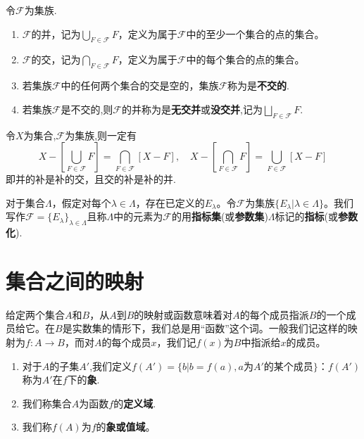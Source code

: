 \documentclass[lang=cn,newtx,10pt,scheme=chinese]{../Template/elegantbook}
\begin{document}
\begin{definition}[集族的并和交]\label{definition:集族的并和交}
  令\(\mathcal{F}\)为集族.
  \begin{enumerate}
    \item \(\mathcal{F}\)的并，记为\(\bigcup_{F\in\mathcal{F}}F\)，定义为属于\(\mathcal{F}\)中的至少一个集合的点的集合。

    \item \(\mathcal{F}\)的交，记为\(\bigcap_{F\in\mathcal{F}}F\)，定义为属于\(\mathcal{F}\)中的每个集合的点的集合。
    
    \item 若集族\(\mathcal{F}\)中的任何两个集合的交是空的，集族\(\mathcal{F}\)称为是\textbf{不交的}.

    \item 若集族\(\mathcal{F}\)是不交的,则\(\mathcal{F}\)的并称为是\textbf{无交并}或\textbf{没交并},记为$\bigsqcup_{F\in \mathcal{F}}{F}$.
  \end{enumerate}
\end{definition}

\begin{theorem}[De Morgan等式]\label{theorem:De Morgan等式}
  令$X$为集合,\(\mathcal{F}\)为集族,则一定有
\[
X-\left[\bigcup_{F\in\mathcal{F}}F\right]=\bigcap_{F\in\mathcal{F}}[X- F],\quad X-\left[\bigcap_{F\in\mathcal{F}}F\right]=\bigcup_{F\in\mathcal{F}}[X- F]
\]
即并的补是补的交，且交的补是补的并.
\end{theorem}

\begin{definition}[指标集]\label{definition:指标集}
  对于集合\(\Lambda\)，假定对每个\(\lambda\in\Lambda\)，存在已定义的\(E_{\lambda}\)。令\(\mathcal{F}\)为集族\(\{E_{\lambda}|\lambda\in\Lambda\}\)。我们写作\(\mathcal{F}=\{E_{\lambda}\}_{\lambda\in\Lambda}\)且称$\Lambda$中的元素为\(\mathcal{F}\)的用\textbf{指标集}(或\textbf{参数集})\(\Lambda\)标记的\textbf{指标}(或\textbf{参数化}).
\end{definition}


\section{集合之间的映射}

\begin{definition}[映射的基本概念]\label{definition:映射的基本概念}
  给定两个集合\(A\)和\(B\)，从\(A\)到\(B\)的映射或函数意味着对\(A\)的每个成员指派\(B\)的一个成员给它。在\(B\)是实数集的情形下，我们总是用“函数”这个词。一般我们记这样的映射为\(f:A\to B\)，而对\(A\)的每个成员\(x\)，我们记\(f(x)\)为\(B\)中指派给\(x\)的成员。
  \begin{enumerate}
    \item  对于\(A\)的子集\(A'\),我们定义\(f(A') = \{b|b = f(a), a\text{为}A'\text{的某个成员}\}\)：\(f(A')\)称为\(A'\)在\(f\)下的\textbf{象}.

    \item 我们称集合\(A\)为函数\(f\)的\textbf{定义域}.

    \item 我们称\(f(A)\)为\(f\)的\textbf{象或值域}。
  \end{enumerate}
  
\end{definition}
\end{document}

